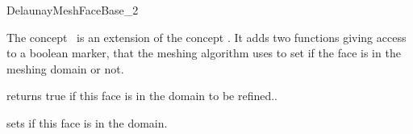 \begin{ccRefConcept}{DelaunayMeshFaceBase_2}

\ccDefinition

The concept \ccRefName\ is an extension of the concept
. It adds two functions giving access to
a boolean marker, that the meshing algorithm uses to set if the face
is in the meshing domain or not.

\ccRefines
{}


\ccAccessFunctions

{ returns true if this face is in the domain to be refined..}

{ sets if this face is in the domain. }

\ccHasModels
{}

\end{ccRefConcept}

